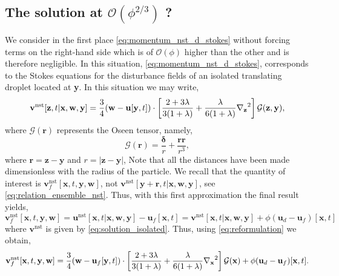 \subsection{The solution at $\mathcal{O}(\phi^{2/3})$ ? } 

We consider in the first place \ref{eq:momentum_nst_d_stokes} without forcing terms on the right-hand side which is of $\mathcal{O}(\phi)$ higher than the other and is therefore negligible. 
In this situation, \ref{eq:momentum_nst_d_stokes}, corresponds to the Stokes equations for the disturbance fields of an isolated translating droplet located at \textbf{y}. 
In this situation we may write, 
\begin{equation}
    \textbf{v}^\text{nst}[\textbf{z},t|\textbf{x},\textbf{w},\textbf{y}]
    = 
    \frac{3}{4}(\textbf{w}- \textbf{u}[\textbf{y},t])\cdot\left[
        \frac{2+3\lambda}{3(1+\lambda)}
        +
        \frac{\lambda}{6(1+\lambda)}\pddz^2 
    \right]\mathcal{G}(\textbf{z},\textbf{y}),
    \label{eq:solution_isolated}
\end{equation}
where $\mathcal{G}(\textbf{r})$ represents the Oseen tensor, namely, 
\begin{equation}
    \mathcal{G}(\textbf{r})
    = \frac{\bm\delta}{r}
    + \frac{\textbf{rr}}{r^3},
\end{equation}
where $\textbf{r} = \textbf{z} - \textbf{y}$ and $r = |\textbf{z} - \textbf{y}|$, 
Note that all the distances have been made dimensionless with the radius of the particle. 
We recall that the quantity of interest  is $\textbf{v}^\text{nst}_f[\textbf{x},t,\textbf{y},\textbf{w}]$, not $\textbf{v}^\text{nst}[\textbf{y}+\textbf{r},t|\textbf{x},\textbf{w},\textbf{y}]$, see \ref{eq:relation_ensemble_nst}. 
Thus, with this first approximation the final result yields,
\begin{equation}
    \textbf{v}^\text{nst}_f[\textbf{x},t,\textbf{y},\textbf{w}]
    = 
    \textbf{u}^\text{nst}[\textbf{x},t|\textbf{x},\textbf{w},\textbf{y}]
    - \textbf{u}_f[\textbf{x},t]
    = 
    \textbf{v}^\text{nst}[\textbf{x},t|\textbf{x},\textbf{w},\textbf{y}]
    + \phi(\textbf{u}_d - \textbf{u}_f)[\textbf{x},t]
    \label{eq:reformulation}
\end{equation}
where $\textbf{v}^\text{nst}$ is given by \ref{eq:solution_isolated}. 
Thus, using \ref{eq:reformulation} we obtain, 
\begin{equation}
    \textbf{v}^\text{nst}_f[\textbf{x},t,\textbf{y},\textbf{w}]
    = 
    \frac{3}{4}(\textbf{w}- \textbf{u}_f[\textbf{y},t])\cdot\left[
        \frac{2+3\lambda}{3(1+\lambda)}
        +
        \frac{\lambda}{6(1+\lambda)}\pddx^2 
    \right]\mathcal{G}(\textbf{x})
    + \phi(\textbf{u}_d - \textbf{u}_f)[\textbf{x},t].
    \label{eq:solution_isolated_at_x}
\end{equation}
